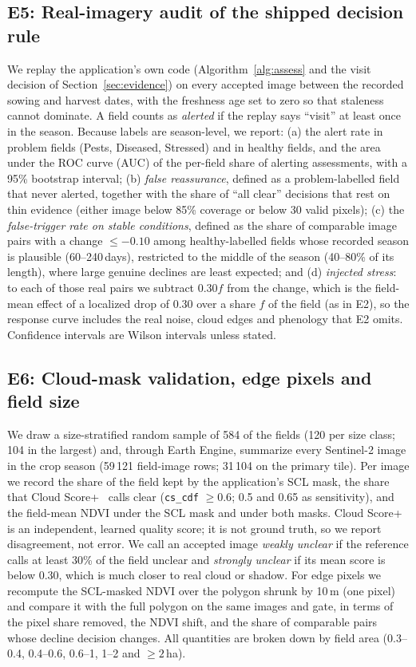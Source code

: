 \documentclass[conference]{IEEEtran}
\begin{document}
\subsection{E5: Real-imagery audit of the shipped decision rule}
We replay the application's own code (Algorithm~\ref{alg:assess} and the visit decision of Section~\ref{sec:evidence}) on every accepted image between the recorded sowing and harvest dates, with the freshness age set to zero so that staleness cannot dominate. A field counts as \emph{alerted} if the replay says ``visit'' at least once in the season. Because labels are season-level, we report: (a) the alert rate in problem fields (Pests, Diseased, Stressed) and in healthy fields, and the area under the ROC curve (AUC) of the per-field share of alerting assessments, with a 95\% bootstrap interval; (b) \emph{false reassurance}, defined as a problem-labelled field that never alerted, together with the share of ``all clear'' decisions that rest on thin evidence (either image below 85\% coverage or below 30 valid pixels); (c) the \emph{false-trigger rate on stable conditions}, defined as the share of comparable image pairs with a change $\le-0.10$ among healthy-labelled fields whose recorded season is plausible (60--240\,days), restricted to the middle of the season (40--80\% of its length), where large genuine declines are least expected; and (d) \emph{injected stress}: to each of those real pairs we subtract $0.30f$ from the change, which is the field-mean effect of a localized drop of 0.30 over a share $f$ of the field (as in E2), so the response curve includes the real noise, cloud edges and phenology that E2 omits. Confidence intervals are Wilson intervals unless stated.

\subsection{E6: Cloud-mask validation, edge pixels and field size}
We draw a size-stratified random sample of 584 of the fields (120 per size class; 104 in the largest) and, through Earth Engine, summarize every Sentinel-2 image in the crop season (59\,121 field-image rows; 31\,104 on the primary tile). Per image we record the share of the field kept by the application's SCL mask, the share that Cloud Score+~\cite{pasquarella2023} calls clear (\texttt{cs\_cdf} $\ge0.6$; 0.5 and 0.65 as sensitivity), and the field-mean NDVI under the SCL mask and under both masks. Cloud Score+ is an independent, learned quality score; it is not ground truth, so we report disagreement, not error. We call an accepted image \emph{weakly unclear} if the reference calls at least 30\% of the field unclear and \emph{strongly unclear} if its mean score is below 0.30, which is much closer to real cloud or shadow. For edge pixels we recompute the SCL-masked NDVI over the polygon shrunk by 10\,m (one pixel) and compare it with the full polygon on the same images and gate, in terms of the pixel share removed, the NDVI shift, and the share of comparable pairs whose decline decision changes. All quantities are broken down by field area (0.3--0.4, 0.4--0.6, 0.6--1, 1--2 and $\ge2$\,ha).
\end{document}
